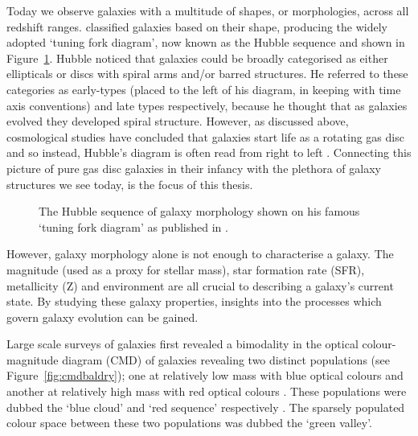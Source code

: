 Today we observe galaxies with a multitude of shapes, or morphologies, across all redshift ranges. \cite{hubble36} classified galaxies based on their shape, producing the widely adopted `tuning fork diagram', now known as the Hubble sequence and shown in Figure~\ref{fig:hubble}. Hubble noticed that galaxies could be broadly categorised as either ellipticals or discs with spiral arms and/or barred structures. He referred to these categories as early-types (placed to the left of his diagram, in keeping with time axis conventions) and late types respectively, because he thought that as galaxies evolved they developed spiral structure. However, as discussed above, cosmological studies have concluded that galaxies start life as a rotating gas disc and so instead, Hubble's diagram is often read from right to left \citep[with some debate over the placement of the S0 galaxies in this picture;][]{kormendy96}. Connecting this picture of pure gas disc galaxies in their infancy with the plethora of galaxy structures we see today, is the focus of this thesis. 

\begin{figure}
\caption[The Hubble sequence for morphological classification of galaxies]{The Hubble sequence of galaxy morphology shown on his famous `tuning fork diagram' as published in \cite{hubble36}.}
\label{fig:hubble}
\end{figure}


However, galaxy morphology alone is not enough to characterise a galaxy. The magnitude (used as a proxy for stellar mass), star formation rate (SFR), metallicity (Z) and environment are all crucial to describing a galaxy's current state. By studying these galaxy properties, insights into the processes which govern galaxy evolution can be gained.

Large scale surveys of galaxies first revealed a bimodality in the optical colour-magnitude diagram (CMD) of galaxies revealing two distinct populations (see Figure~\ref{fig:cmdbaldry}); one at relatively low mass with blue optical colours and another at relatively high mass with red optical colours \citep{Baldry04, Baldry06, Willmer06, ball08, Brammer09}. These populations were dubbed the `blue cloud' and `red sequence' respectively \citep{Chester64, bower92, Bell04, Driver06, Faber07}.  The sparsely populated colour space between these two populations was dubbed the  `green valley'.


